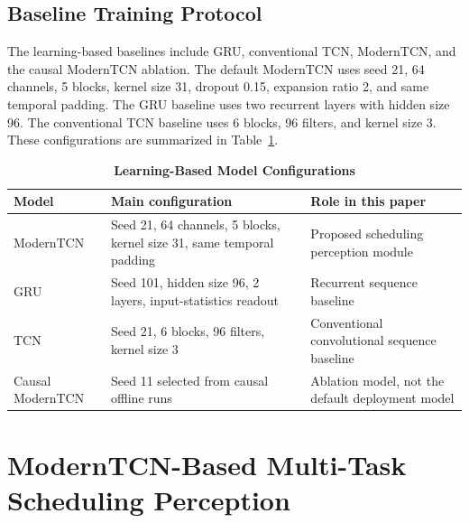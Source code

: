 \documentclass[twocolumn]{article}
\begin{document}
\subsection{Baseline Training Protocol}

The learning-based baselines include GRU, conventional TCN, ModernTCN, and the causal ModernTCN ablation. The default ModernTCN uses seed 21, 64 channels, 5 blocks, kernel size 31, dropout 0.15, expansion ratio 2, and same temporal padding. The GRU baseline uses two recurrent layers with hidden size 96. The conventional TCN baseline uses 6 blocks, 96 filters, and kernel size 3. These configurations are summarized in Table~\ref{tab:model_configs}.

\begin{table}[!t]

\caption{\textbf{Learning-Based Model Configurations}}

\label{tab:model_configs}

\setlength{\tabcolsep}{3pt}

\begin{tabular}{|p{58pt}|p{75pt}|p{105pt}|}

\hline

Model & Main configuration & Role in this paper \\

\hline

ModernTCN & Seed 21, 64 channels, 5 blocks, kernel size 31, same temporal padding & Proposed scheduling perception module \\

GRU & Seed 101, hidden size 96, 2 layers, input-statistics readout & Recurrent sequence baseline \\

TCN & Seed 21, 6 blocks, 96 filters, kernel size 3 & Conventional convolutional sequence baseline \\

Causal ModernTCN & Seed 11 selected from causal offline runs & Ablation model, not the default deployment model \\

\hline

\end{tabular}

\end{table}

\section{ModernTCN-Based Multi-Task Scheduling Perception}
\end{document}
